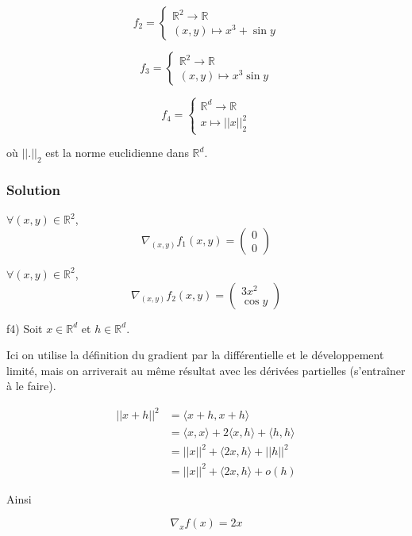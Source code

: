 \documentclass[
10pt, %
a4paper, %
oneside, %
headinclude,footinclude, %
BCOR5mm, %
]{scrartcl}
\begin{document}
$$
f_2 = \left\{
    \begin{array}{ll}
        \mathbb{R}^2 \rightarrow \mathbb{R}  \\
	(x,y)\mapsto x^3+\sin y
    \end{array}
\right.
$$

$$
f_3 = \left\{
    \begin{array}{ll}
        \mathbb{R}^2 \rightarrow \mathbb{R}  \\
	(x,y)\mapsto x^3\sin y
    \end{array}
\right.
$$

$$
f_4 = \left\{
    \begin{array}{ll}
        \mathbb{R}^d \rightarrow \mathbb{R}  \\
	x\mapsto ||x||_2^2
    \end{array}
\right.
$$

où $||.||_2$ est la norme euclidienne dans $\mathbb{R}^d$.

\subsubsection{Solution}

$\forall (x,y)\in \mathbb{R}^2$, 
\begin{equation*}
    \nabla_{(x,y)}f_1(x,y)=
\begin{pmatrix}
    0\\
    0
\end{pmatrix}
\end{equation*}

$\forall (x,y)\in \mathbb{R}^2$, 
\begin{equation*}
    \nabla_{(x,y)}f_2(x,y)=
\begin{pmatrix}
    3x^2\\
    \cos y
\end{pmatrix}
\end{equation*}

f4) Soit $x\in \mathbb{R}^d$ et $h\in \mathbb{R}^d$.

Ici on utilise la définition du gradient par la différentielle et le développement limité, mais on arriverait au même résultat avec les dérivées partielles (s'entraîner à le faire).

\begin{equation}
\begin{aligned}
    \label{eq:}
    ||x+h||^2 &= \langle x+h, x+h \rangle\\
    &= \langle x, x \rangle + 2 \langle x, h \rangle + \langle h, h \rangle\\
    &= ||x||^2 + \langle 2x, h \rangle + ||h||^2\\
    &= ||x||^2 + \langle 2x, h \rangle + o(h)
\end{aligned}    
\end{equation}

Ainsi 

\begin{equation}
    \nabla_xf(x) = 2x
\end{equation}
\end{document}
